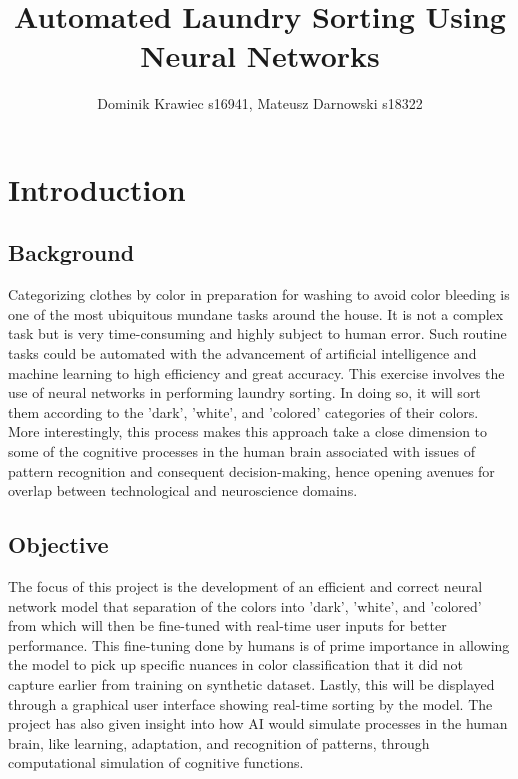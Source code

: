 \documentclass{article}
\title{Automated Laundry Sorting Using Neural Networks}
\author{Dominik Krawiec s16941, Mateusz Darnowski s18322}
\date{}
\begin{document}
\maketitle
\newpage

\tableofcontents
\newpage



\section{Introduction}

\subsection{Background}
Categorizing clothes by color in preparation for washing to avoid color bleeding is one of the most ubiquitous mundane tasks around the house. It is not a complex task but is very time-consuming and highly subject to human error. Such routine tasks could be automated with the advancement of artificial intelligence and machine learning to high efficiency and great accuracy. This exercise involves the use of neural networks in performing laundry sorting. In doing so, it will sort them according to the 'dark', 'white', and 'colored' categories of their colors. More interestingly, this process makes this approach take a close dimension to some of the cognitive processes in the human brain associated with issues of pattern recognition and consequent decision-making, hence opening avenues for overlap between technological and neuroscience domains.
\subsection{Objective}
The focus of this project is the development of an efficient and correct neural network model that separation of the colors into 'dark', 'white', and 'colored' from which will then be fine-tuned with real-time user inputs for better performance. This fine-tuning done by humans is of prime importance in allowing the model to pick up specific nuances in color classification that it did not capture earlier from training on synthetic dataset. Lastly, this will be displayed through a graphical user interface showing real-time sorting by the model. The project has also given insight into how AI would simulate processes in the human brain, like learning, adaptation, and recognition of patterns, through computational simulation of cognitive functions.
\end{document}
